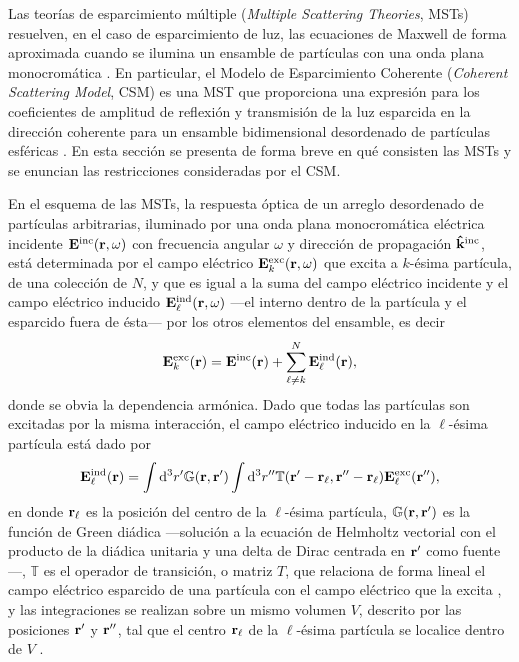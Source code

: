 
Las teorías de esparcimiento múltiple (\textit{Multiple Scattering Theories}, MSTs) resuelven, en el caso de esparcimiento de luz, las ecuaciones de Maxwell de forma aproximada cuando se ilumina un ensamble de partículas con una onda plana monocromática \cite{loiko_monolayers_1998,barrera1991optical,reyes2018analytical}. En particular, el  Modelo de Esparcimiento Coherente (\textit{Coherent Scattering Model}, CSM)  es una MST que proporciona una expresión para los coeficientes de amplitud de reflexión y transmisión de la luz esparcida en la dirección coherente para un ensamble bidimensional desordenado de partículas esféricas \cite{barrera_coherent_2003,garcia2012multiple,reyes2018analytical}. En esta sección se presenta de forma breve en qué consisten las MSTs y se enuncian las restricciones consideradas por el CSM.

En el esquema de las MSTs, la respuesta óptica de un arreglo desordenado de partículas arbitrarias, iluminado por una onda plana monocromática eléctrica incidente $\vb{E}^\text{inc}(\vb{r},\omega)$ con frecuencia angular $\omega$ y dirección de propagación $\vu{k}^\text{inc}$, está determinada por el campo eléctrico $\vb{E}^\text{exc}_k(\vb{r},\omega)$ que excita a $k$-ésima partícula, de una colección de $N$, y que es igual a la suma del campo eléctrico incidente y el campo eléctrico inducido $\vb{E}^\text{ind}_\ell(\vb{r},\omega)$ ---el interno dentro de la partícula y el esparcido fuera de ésta--- por los otros elementos del ensamble, es decir \cite{garcia2012multiple,barrera_coherent_2003}
%
\begin{align}
	\vb{E}^\text{exc}_k(\vb{r}) = \vb{E}^\text{inc}(\vb{r}) + \sum_{\ell\neq k}^N \vb{E}^\text{ind}_\ell(\vb{r}),
	\label{eq:Eexc}
\end{align}
%
donde se obvia la dependencia armónica. Dado que todas las partículas son excitadas por la misma interacción,  el campo eléctrico inducido en la $\ell$-ésima partícula está dado por \cite{garcia2012multiple,barrera_coherent_2003}
%
\begin{align}
	\vb{E}^\text{ind}_\ell(\vb{r}) =
	\int\dd^3 r' \mathbb{G}(\vb{r},\vb{r}')
	\int\dd^3 r''\mathbb{T}(\vb{r}'-\vb{r}_\ell,\vb{r}''-\vb{r}_\ell) \vb{E}_\ell^\text{exc}(\vb{r}''),
	\label{eq:Eind}
\end{align}
%
en donde $\vb{r}_\ell$ es la posición del centro de la $\ell$-ésima partícula, $\mathbb{G}(\vb{r},\vb{r}')$ es la función de Green diádica ---solución a la ecuación de Helmholtz vectorial con el producto de la diádica unitaria y una delta de Dirac centrada en $\vb{r}'$ como fuente \cite{tsang_scattering_2000}---, $\mathbb{T}$ es el operador de transición, o matriz $T$, que relaciona de forma lineal el campo eléctrico esparcido de una partícula con el campo eléctrico que la excita \cite{tsang_scattering_2000}, y las integraciones se realizan sobre un mismo volumen $V$, descrito por las posiciones $\vb{r}'$ y $\vb{r}''$, tal que el centro $\vb{r}_\ell$ de la $\ell$-ésima partícula se localice dentro de $V$ \cite{barrera_coherent_2003}.

